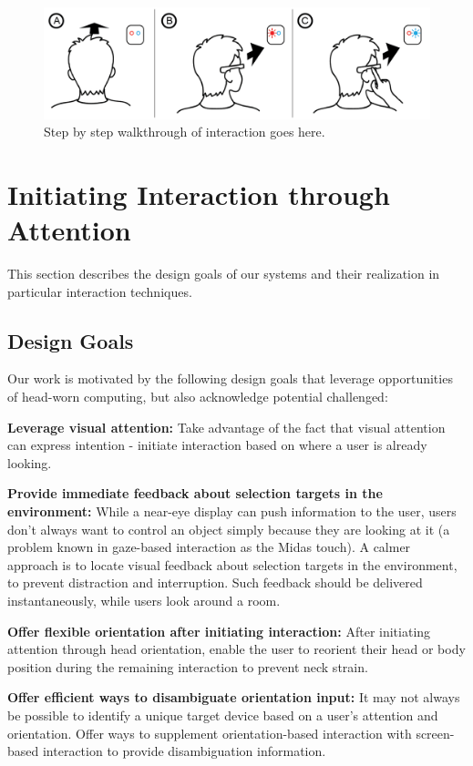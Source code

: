 \begin{figure}[t!]
\centering
\includegraphics[width=\columnwidth]{figures/stepbystep-edited-bh.png}
\caption{Step by step walkthrough of interaction goes here.}
\label{fig:interaction}
\end{figure}


\section{Initiating Interaction through Attention}
This section describes the design goals of our systems and their realization in particular interaction techniques.

\subsection{Design Goals}
Our work is motivated by the following design goals that leverage opportunities of head-worn computing, but also acknowledge potential challenged:

{\bf Leverage visual attention:} Take advantage of the fact that visual attention can express intention - initiate interaction based on where a user is already looking. 

{\bf Provide immediate feedback about selection targets in the environment:} While a near-eye display can push information to the user, users don't always want to control an object simply because they are looking at it (a problem known in gaze-based interaction as the Midas touch). A calmer~\cite{weiser_coming_1997} approach is to locate visual feedback about selection targets in the environment, to prevent distraction and interruption. Such feedback should be delivered instantaneously, while users look around a room.

{\bf Offer flexible orientation after initiating interaction:} After initiating attention through head orientation, enable the user to reorient their head or body position during the remaining interaction to prevent neck strain.

{\bf Offer efficient ways to disambiguate orientation input:} It may not always be possible to identify a unique target device based on a user's attention and orientation. Offer ways to supplement orientation-based interaction with screen-based interaction to provide disambiguation information.

